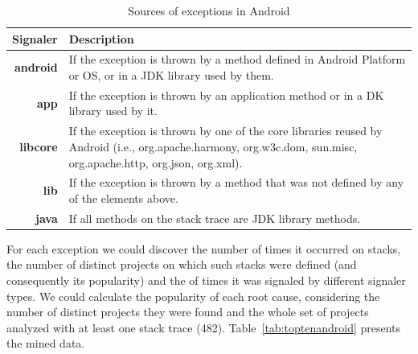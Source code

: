 \documentclass[conference]{IEEEtran}
\begin{document}
\begin{table}
  \centering
  \begin{tabular}{rp{29em}}
    \hline
    \bfseries{Signaler} & \bfseries{Description} \\
    \hline
    \bfseries{android} & If the exception is thrown by a method defined in Android Platform or OS, or in a JDK library used by them.\\
    \bfseries{app}     & If the exception is thrown by an application method or in a  DK library used by it.\\
    \bfseries{libcore} & If the exception is thrown by one of the core libraries reused by Android (i.e., org.apache.harmony, org.w3c.dom, sun.misc, org.apache.http, org.json, org.xml). \\
    \bfseries{lib}     & If the exception is thrown by a method that was not defined by any of the elements above.\\
    \bfseries{java}    & If all methods on the stack trace are JDK library methods.\\
    \hline
  \end{tabular}
  \caption{Sources of exceptions in Android}
  \label{tab:signalers}
\end{table}

For each exception we could discover the number of times it occurred on stacks,
the number of distinct projects on which such stacks were defined (and consequently its
popularity) and the of times it was signaled by different signaler types. We
could calculate the popularity of each root cause, considering the number of
distinct projects they were found and the whole set of projects analyzed with at
least one stack trace (482). Table~\ref{tab:toptenandroid} 
presents the mined data.
\end{document}
